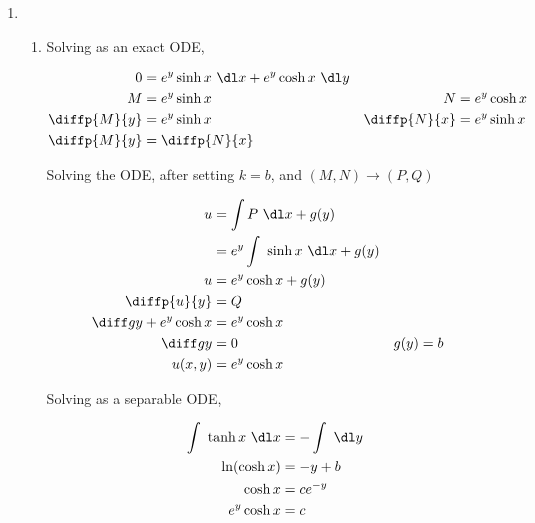 \begin{enumerate}
    \item \begin{enumerate}
              \item Solving as an exact ODE,

                    \begin{align}
                        0            & = e^{y}\sinh x  \ \dl x + e^{y} \cosh x
                        \ \dl y                                                  \\
                        M            & = e^{y} \sinh x                         &
                        N            & = e^{y} \cosh x                           \\
                        \diffp{M}{y} & = e^{y} \sinh x                         &
                        \diffp{N}{x} & = e^{y} \sinh x                           \\
                        \diffp{M}{y} & = \diffp{N}{x}
                    \end{align}

                    Solving the ODE, after setting $ k = b $, and $ (M, N) \to (P, Q)$

                    \begin{align}
                        u                       & = \int P\ \dl x + g(y)        \\
                                                & = e^{y}\int\ \sinh x\ \dl x
                        + g(y)                                                  \\
                        u                       & = e^{y} \cosh x + g(y)        \\
                        \diffp{u}{y}            & = Q                           \\
                        \diff gy + e^{y}\cosh x & = e^{y}\cosh x                \\
                        \diff gy                & = 0                         &
                        g(y)                    & = b                           \\
                        u(x, y)                 & = e^{y} \cosh x
                    \end{align}


                    Solving as a separable ODE,

                    \begin{align}
                        \int\ \tanh x\ \dl x & = -\int\ \dl y \\
                        \ln (\cosh x)        & = -y + b       \\
                        \cosh x              & = ce^{-y}      \\
                        e^{y}\cosh x         & = c
                    \end{align}


\end{enumerate}
\end{enumerate}
